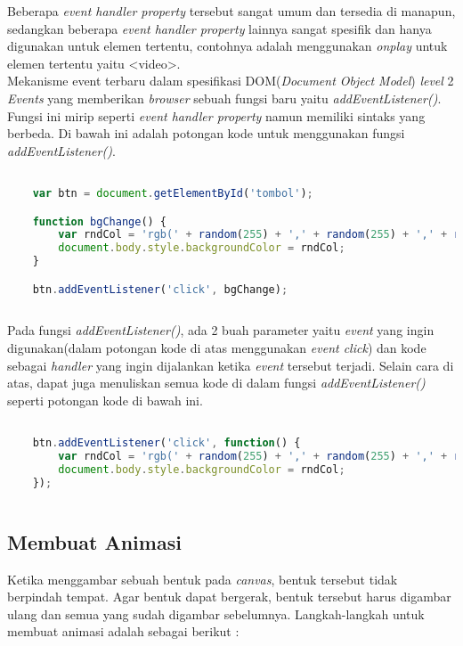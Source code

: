 Beberapa \textit{event handler property} tersebut sangat umum dan tersedia di manapun, sedangkan beberapa \textit{event handler property} lainnya sangat spesifik dan hanya digunakan untuk elemen tertentu, contohnya adalah menggunakan \textit{onplay} untuk elemen tertentu yaitu <video>.\\

Mekanisme event terbaru dalam spesifikasi DOM(\textit{Document Object Model}) \textit{level} 2 \textit{Events} yang memberikan \textit{browser} sebuah fungsi baru yaitu \textit{addEventListener()}. Fungsi ini mirip seperti \textit{event handler property} namun memiliki sintaks yang berbeda. Di bawah ini adalah potongan kode untuk menggunakan fungsi \textit{addEventListener()}.

\begin{lstlisting}[language=Javascript, caption=Menggunakan fungsi addEventListener()]

	var btn = document.getElementById('tombol');

	function bgChange() {
  		var rndCol = 'rgb(' + random(255) + ',' + random(255) + ',' + random(255) + ')';
  		document.body.style.backgroundColor = rndCol;
	}   

	btn.addEventListener('click', bgChange);
	
\end{lstlisting}

Pada fungsi \textit{addEventListener()}, ada 2 buah parameter yaitu \textit{event} yang ingin digunakan(dalam potongan kode di atas menggunakan \textit{event click}) dan kode sebagai \textit{handler} yang ingin dijalankan ketika \textit{event} tersebut terjadi. Selain cara di atas, dapat juga menuliskan semua kode di dalam fungsi \textit{addEventListener()} seperti potongan kode di bawah ini.

\begin{lstlisting}[language=Javascript, caption=Menuliskan kode di dalam fungsi addEventListener()]

	btn.addEventListener('click', function() {
  		var rndCol = 'rgb(' + random(255) + ',' + random(255) + ',' + random(255) + ')';
  		document.body.style.backgroundColor = rndCol;
	});
	
\end{lstlisting}


\subsection{Membuat Animasi}
Ketika menggambar sebuah bentuk pada \textit{canvas}, bentuk tersebut tidak berpindah tempat. Agar bentuk dapat bergerak, bentuk tersebut harus digambar ulang dan semua yang sudah digambar sebelumnya. Langkah-langkah untuk membuat animasi adalah sebagai berikut :

